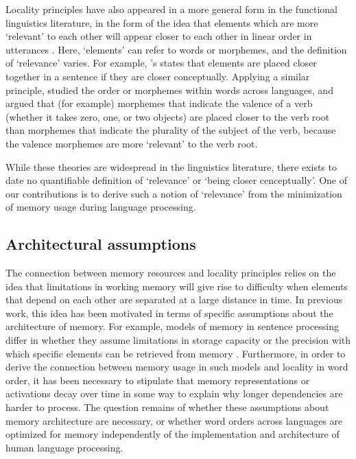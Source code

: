 Locality principles have also appeared in a more general form in the functional linguistics literature, in the form of the idea that elements which are more `relevant' to each other will appear closer to each other in linear order in utterances \citep{behaghel1932deutsche,givon1985iconicity,givon1991markedness,bybee-morphology-1985,newmeyer1992iconicity}. Here, `elements' can refer to words or morphemes, and the definition of `relevance' varies. For example, \citet{givon1985iconicity}'s  states that elements are placed closer together in a sentence if they are closer conceptually.
Applying a similar principle, \citet{bybee-morphology-1985} studied the order or morphemes within words across languages, and argued that (for example) morphemes that indicate the valence of a verb (whether it takes zero, one, or two objects) are placed closer to the verb root than morphemes that indicate the plurality of the subject of the verb, because the valence morphemes are more `relevant' to the verb root. %

While these theories are widespread in the linguistics literature, there exists to date no quantifiable definition of `relevance' or `being closer cenceptually'. One of our contributions is to derive such a notion of `relevance' from the minimization of memory usage during language processing. %


\subsection{Architectural assumptions}

The connection between memory resources and locality principles relies on the idea that limitations in working memory will give rise to difficulty when elements that depend on each other are separated at a large distance in time. In previous work, this idea has been motivated in terms of specific assumptions about the architecture of memory. For example, models of memory in sentence processing differ in whether they assume limitations in storage capacity \citep[e.g., `memory cost' in the model of][]{gibson1998linguistic} or the precision with which specific elements can be retrieved from memory \citep[e.g.][]{lewis-activation-based-2005}. Furthermore, in order to derive the connection between memory usage in such models and locality in word order, it has been necessary to stipulate that memory representations or activations decay over time in some way to explain why longer dependencies are harder to process.
The question remains of whether these assumptions about memory architecture are necessary, or whether word orders across languages are optimized for memory independently of the implementation and architecture of human language processing.

